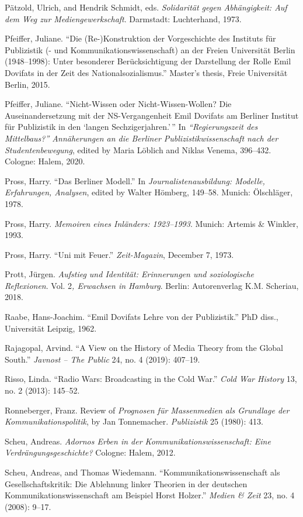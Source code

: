 \documentclass{tufte-handout}
\begin{document}
\begin{hangparas}{.25in}{1}
Pätzold, Ulrich, and Hendrik Schmidt, eds. \emph{Solidarität gegen
Abhängigkeit: Auf dem Weg zur Mediengewerkschaft}. Darmstadt:
Luchterhand, 1973.

Pfeiffer, Juliane. ``Die (Re-)Konstruktion der Vorgeschichte des
Instituts für Publizistik (- und Kommunikationswissenschaft) an der
Freien Universität Berlin (1948--1998): Unter besonderer
Berücksichtigung der Darstellung der Rolle Emil Dovifats in der Zeit des
Nationalsozialismus.'' Master's thesis, Freie Universität Berlin, 2015.

Pfeiffer, Juliane. ``Nicht-Wissen oder Nicht-Wissen-Wollen? Die
Auseinandersetzung mit der NS-Vergangenheit Emil Dovifats am Berliner
Institut für Publizistik in den `langen Sechzigerjahren.'\,'' In
\emph{``Regierungszeit des Mittelbaus?'' Annäherungen an die Berliner
Publizistikwissenschaft nach der Studentenbewegung}, edited by Maria
Löblich and Niklas Venema, 396--432. Cologne: Halem, 2020.

Pross, Harry. ``Das Berliner Modell.'' In \emph{Journalistenausbildung:
Modelle, Erfahrungen, Analysen}, edited by Walter Hömberg, 149--58.
Munich: Ölschläger, 1978.

Pross, Harry. \emph{Memoiren eines Inländers: 1923--1993}. Munich:
Artemis \& Winkler, 1993.

Pross, Harry. ``Uni mit Feuer.'' \emph{Zeit-Magazin}, December 7, 1973.

Prott, Jürgen. \emph{Aufstieg und Identität: Erinnerungen und
soziologische Reflexionen}. Vol. 2\emph{, Erwachsen in Hamburg}. Berlin:
Autorenverlag K.M. Scheriau, 2018.

Raabe, Hans-Joachim. ``Emil Dovifats Lehre von der Publizistik.'' PhD
diss., Universität Leipzig, 1962.

Rajagopal, Arvind. ``A View on the History of Media Theory from the
Global South.'' \emph{Javnost -- The Public} 24, no. 4 (2019): 407--19.

Risso, Linda. ``Radio Wars: Broadcasting in the Cold War.'' \emph{Cold
War History} 13, no. 2 (2013): 145--52.

Ronneberger, Franz. Review of \emph{Prognosen für Massenmedien als
Grundlage der Kommunikationspolitik}, by Jan Tonnemacher.
\emph{Publizistik} 25 (1980): 413.

Scheu, Andreas. \emph{Adornos Erben in der Kommunikationswissenschaft:
Eine Verdrängungsgeschichte?} Cologne: Halem, 2012.

Scheu, Andreas, and Thomas Wiedemann. ``Kommunikationswissenschaft als
Gesellschaftskritik: Die Ablehnung linker Theorien in der deutschen
Kommunikationswissenschaft am Beispiel Horst Holzer.'' \emph{Medien \&
Zeit} 23, no. 4 (2008): 9--17.


\end{hangparas}
\end{document}
